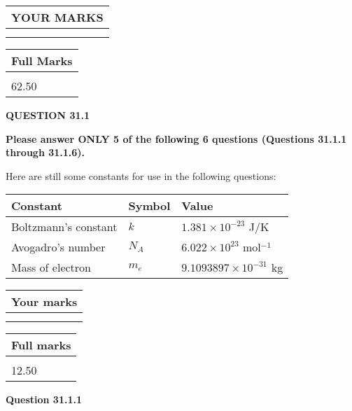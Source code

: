 \documentclass[12pt]{article}
\begin{document}
 
   
   
  
\vspace{0.2in}
  
\noindent\begin{tabular}{|l|}
\hline
 YOUR MARKS  \\
\hline
 \\ 
 \\ 
\hline
\end{tabular}
\hspace{0.05in} \begin{tabular}{|l|}
\hline
 Full Marks  \\
\hline
 \\ 
62.50 \\
\hline
\end{tabular}
{\textbf{\Large{QUESTION
31.1 
}}}
  
  
 
{\textbf{\Large{Please answer ONLY
5 of the following
6 questions (Questions
31.1.1 through
31.1.6). }}}
 
Here are still some constants for use in the following questions:
 
 
\noindent\begin{tabular}{|l|l|l|}
\hline
Constant & Symbol & Value \\
\hline
 
Boltzmann's constant &
$k$ &
 $ 1.381 \times 10^{-23} $
J/K \\
\hline
 
Avogadro's number &
$N_A$ &
 $ 6.022 \times 10^{23} $
mol$^{-1}$ \\
\hline
 
Mass of electron &
$m_e$ &
 $ 9.1093897 \times 10^{-31} $
kg \\
\hline
 
\end{tabular}
 
  
\vspace{0.2in}
  
         \begin{tabular}{|l|}
\hline
 Your marks  \\
\hline
 \\ 
 \\ 
\hline
\end{tabular}
\hspace{0.05in} \begin{tabular}{|l|}
\hline
 Full marks  \\
\hline
 \\ 
12.50 \\
\hline
\end{tabular}
{\textbf{\Large{Question
31.1.1 
}}}
  
\end{document}
